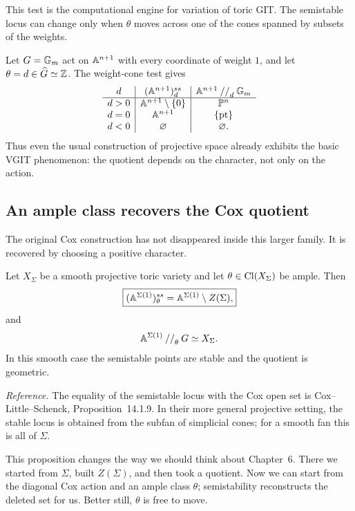 This test is the computational engine for variation of toric GIT.  The
semistable locus can change only when \(\theta\) moves across one of the
cones spanned by subsets of the weights.

\begin{example}
Let \(G=\mathbb{G}_{m}\) act on \(\mathbb{A}^{n+1}\) with every coordinate of weight
\(1\), and let \(\theta=d\in\widehat G\simeq\mathbb{Z}\).  The weight-cone
test gives
\[
\begin{array}{c|c|c}
d& (\mathbb{A}^{n+1})^{ss}_d&\mathbb{A}^{n+1}\mathbin{//}_d\mathbb{G}_{m}\\
\hline
d>0&\mathbb{A}^{n+1}\setminus\{0\}&\mathbb{P}^n\\
d=0&\mathbb{A}^{n+1}&\{\mathrm{pt}\}\\
d<0&\varnothing&\varnothing.
\end{array}
\]
Thus even the usual construction of projective space already exhibits
the basic VGIT phenomenon: the quotient depends on the character, not
only on the action.
\end{example}

\subsection{An ample class recovers the Cox quotient}

The original Cox construction has not disappeared inside this larger
family.  It is recovered by choosing a positive character.

\begin{proposition}
\label{prop:ample-character-recovers-cox}
Let \(X_\Sigma\) be a smooth projective toric variety and let
\(\theta\in\operatorname{Cl}(X_\Sigma)\) be ample.  Then
\[
\boxed{
(\mathbb{A}^{\Sigma(1)})^{ss}_\theta
=
\mathbb{A}^{\Sigma(1)}\setminus Z(\Sigma),}
\]
and
\[
\mathbb{A}^{\Sigma(1)}\mathbin{//}_\theta G
\simeq X_\Sigma.
\]
In this smooth case the semistable points are stable and the quotient
is geometric.
\end{proposition}

\noindent
\textit{Reference.}
The equality of the semistable locus with the Cox open set is
Cox--Little--Schenck, Proposition~14.1.9.  In their more general
projective setting, the stable locus is obtained from the subfan of
simplicial cones; for a smooth fan this is all of \(\Sigma\).

This proposition changes the way we should think about Chapter~6.
There we started from \(\Sigma\), built \(Z(\Sigma)\), and then took a
quotient.  Now we can start from the diagonal Cox action and an ample
class \(\theta\); semistability reconstructs the deleted set for us.
Better still, \(\theta\) is free to move.

